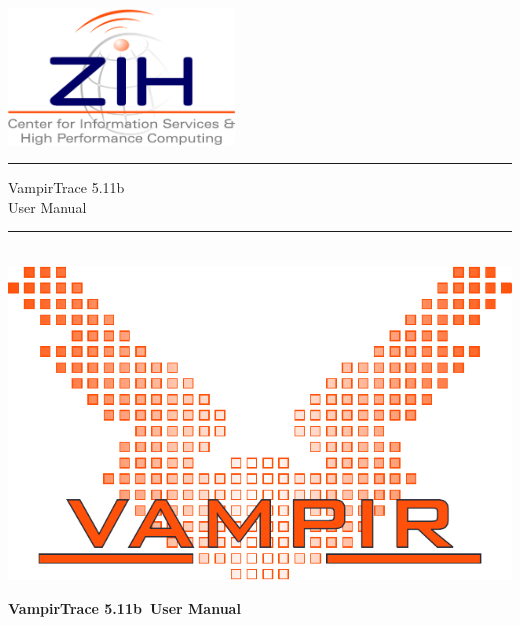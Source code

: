 \documentclass[a4paper,twoside,12pt,BCOR12mm]{scrbook}
\def\vtversion{5.11b}
\begin{document}
\frontmatter


\thispagestyle{empty}

\begin{latexonly}  %
\noindent\includegraphics[width=6cm]{zih_logo}\vspace{3cm}\\
{\bfseries\Huge
\rule[0.75cm]{\textwidth}{1pt}
VampirTrace \vtversion \\[.75cm]
User Manual\\
\rule{0pt}{0.75cm}\rule{\textwidth}{1pt}
}
\vspace{1cm}\\
{\center\includegraphics{vampir_logo}\vspace{4cm}\\}
\end{latexonly}

\begin{htmlonly}  %
{\bfseries\Huge VampirTrace \vtversion~User Manual}\\[1cm]
\end{htmlonly}
\end{document}
